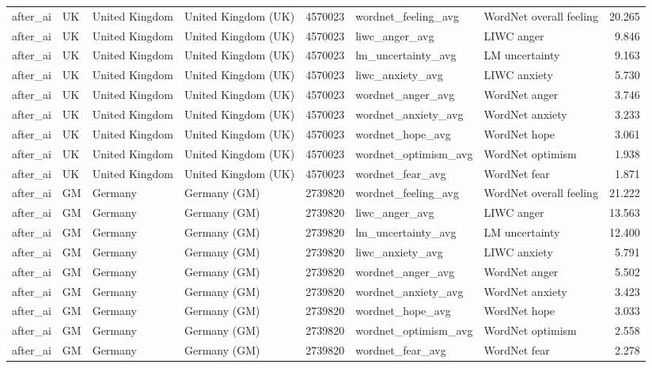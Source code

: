 \begin{tabular}{llllrllr}
after\_ai & UK & United Kingdom & United Kingdom (UK) & 4570023 & wordnet\_feeling\_avg & WordNet overall feeling & 20.265 \\
after\_ai & UK & United Kingdom & United Kingdom (UK) & 4570023 & liwc\_anger\_avg & LIWC anger & 9.846 \\
after\_ai & UK & United Kingdom & United Kingdom (UK) & 4570023 & lm\_uncertainty\_avg & LM uncertainty & 9.163 \\
after\_ai & UK & United Kingdom & United Kingdom (UK) & 4570023 & liwc\_anxiety\_avg & LIWC anxiety & 5.730 \\
after\_ai & UK & United Kingdom & United Kingdom (UK) & 4570023 & wordnet\_anger\_avg & WordNet anger & 3.746 \\
after\_ai & UK & United Kingdom & United Kingdom (UK) & 4570023 & wordnet\_anxiety\_avg & WordNet anxiety & 3.233 \\
after\_ai & UK & United Kingdom & United Kingdom (UK) & 4570023 & wordnet\_hope\_avg & WordNet hope & 3.061 \\
after\_ai & UK & United Kingdom & United Kingdom (UK) & 4570023 & wordnet\_optimism\_avg & WordNet optimism & 1.938 \\
after\_ai & UK & United Kingdom & United Kingdom (UK) & 4570023 & wordnet\_fear\_avg & WordNet fear & 1.871 \\
after\_ai & GM & Germany & Germany (GM) & 2739820 & wordnet\_feeling\_avg & WordNet overall feeling & 21.222 \\
after\_ai & GM & Germany & Germany (GM) & 2739820 & liwc\_anger\_avg & LIWC anger & 13.563 \\
after\_ai & GM & Germany & Germany (GM) & 2739820 & lm\_uncertainty\_avg & LM uncertainty & 12.400 \\
after\_ai & GM & Germany & Germany (GM) & 2739820 & liwc\_anxiety\_avg & LIWC anxiety & 5.791 \\
after\_ai & GM & Germany & Germany (GM) & 2739820 & wordnet\_anger\_avg & WordNet anger & 5.502 \\
after\_ai & GM & Germany & Germany (GM) & 2739820 & wordnet\_anxiety\_avg & WordNet anxiety & 3.423 \\
after\_ai & GM & Germany & Germany (GM) & 2739820 & wordnet\_hope\_avg & WordNet hope & 3.033 \\
after\_ai & GM & Germany & Germany (GM) & 2739820 & wordnet\_optimism\_avg & WordNet optimism & 2.558 \\
after\_ai & GM & Germany & Germany (GM) & 2739820 & wordnet\_fear\_avg & WordNet fear & 2.278 \\

\end{tabular}
